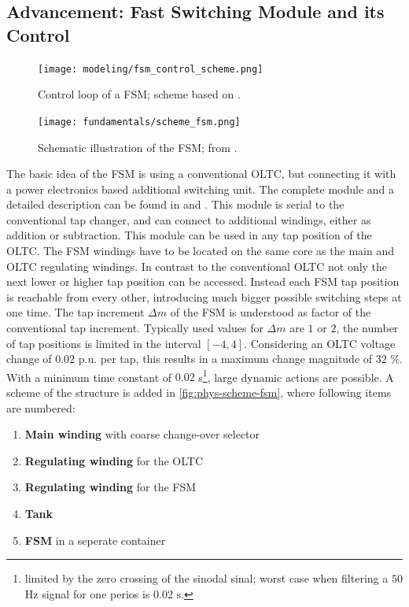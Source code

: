 \subsection{Advancement: Fast Switching Module and its Control}
\label{sec:fsm-description}

\begin{figure}[htb!]
    \centering
    \texttt{[image: modeling/fsm\_control\_scheme.png]}
    \caption[Control loop of a \acf{FSM}]{Control loop of a \acs{FSM}; scheme based on \textcite{burlakin_2024}.}
    \label{fig:fsm-control-loop}
\end{figure}

\begin{figure} 
    \centering
    \texttt{[image: fundamentals/scheme\_fsm.png]}
    \caption[Schematic illustration of the \acs{FSM}]{Schematic illustration of the \acs{FSM}; from \autocite{burlakin_2024a}.}
    \label{fig:phys-scheme-fsm}
\end{figure}
The basic idea of the \acs{FSM} is using a conventional \acs{OLTC}, but connecting it with a power electronics based additional switching unit.
The complete module and a detailed description can be found in \autocite{maschinenfabrikreinhausengmbh_2023} and \autocite{burlakin_2024a}.
This module is serial to the conventional tap changer, and can connect to additional windings, either as addition or subtraction.
This module can be used in any tap position of the \acs{OLTC}.
The \acs{FSM} windings have to be located on the same core as the main and \acs{OLTC} regulating windings.
In contrast to the conventional \acs{OLTC} not only the next lower or higher tap position can be accessed.
Instead each \acs{FSM} tap position is reachable from every other, introducing much bigger possible switching steps at one time.
The tap increment $\Delta m$ of the \acs{FSM} is understood as factor of the conventional tap increment.
Typically used values for $\Delta m$ are $1$ or $2$, the number of tap positions is limited in the interval $[-4,4]$.
Considering an \acs{OLTC} voltage change of $0.02$ p.u. per tap, this results in a maximum change magnitude of $32$ \%.
With a minimum time constant of $0.02$ s\footnote{limited by the zero crossing of the sinodal sinal; worst case when filtering a $50$ Hz signal for one perios is $0.02\text{ s}$.}, large dynamic actions are possible.
A scheme of the structure is added in \autoref{fig:phys-scheme-fsm}, where following items are numbered:
\begin{enumerate}[label=\protect\circled{\arabic*}]
    \item \textbf{Main winding} with coarse change-over selector
    \item \textbf{Regulating winding} for the \acs{OLTC}
    \item \textbf{Regulating winding} for the \acs{FSM}
    \item \textbf{Tank}
    \item \textbf{\acs{FSM}} in a seperate container
\end{enumerate}

